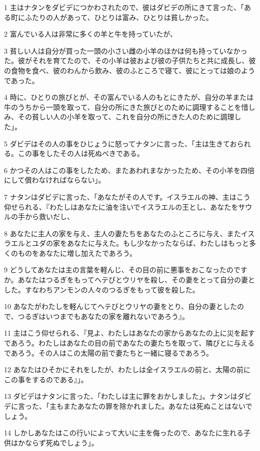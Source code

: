 \par 1 主はナタンをダビデにつかわされたので、彼はダビデの所にきて言った、「ある町にふたりの人があって、ひとりは富み、ひとりは貧しかった。
\par 2 富んでいる人は非常に多くの羊と牛を持っていたが、
\par 3 貧しい人は自分が買った一頭の小さい雌の小羊のほかは何も持っていなかった。彼がそれを育てたので、その小羊は彼および彼の子供たちと共に成長し、彼の食物を食べ、彼のわんから飲み、彼のふところで寝て、彼にとっては娘のようであった。
\par 4 時に、ひとりの旅びとが、その富んでいる人のもとにきたが、自分の羊または牛のうちから一頭を取って、自分の所にきた旅びとのために調理することを惜しみ、その貧しい人の小羊を取って、これを自分の所にきた人のために調理した」。
\par 5 ダビデはその人の事をひじょうに怒ってナタンに言った、「主は生きておられる。この事をしたその人は死ぬべきである。
\par 6 かつその人はこの事をしたため、またあわれまなかったため、その小羊を四倍にして償わなければならない」。
\par 7 ナタンはダビデに言った、「あなたがその人です。イスラエルの神、主はこう仰せられる、『わたしはあなたに油を注いでイスラエルの王とし、あなたをサウルの手から救いだし、
\par 8 あなたに主人の家を与え、主人の妻たちをあなたのふところに与え、またイスラエルとユダの家をあなたに与えた。もし少なかったならば、わたしはもっと多くのものをあなたに増し加えたであろう。
\par 9 どうしてあなたは主の言葉を軽んじ、その目の前に悪事をおこなったのですか。あなたはつるぎをもってヘテびとウリヤを殺し、その妻をとって自分の妻とした。すなわちアンモンの人々のつるぎをもって彼を殺した。
\par 10 あなたがわたしを軽んじてヘテびとウリヤの妻をとり、自分の妻としたので、つるぎはいつまでもあなたの家を離れないであろう』。
\par 11 主はこう仰せられる、『見よ、わたしはあなたの家からあなたの上に災を起すであろう。わたしはあなたの目の前であなたの妻たちを取って、隣びとに与えるであろう。その人はこの太陽の前で妻たちと一緒に寝るであろう。
\par 12 あなたはひそかにそれをしたが、わたしは全イスラエルの前と、太陽の前にこの事をするのである』」。
\par 13 ダビデはナタンに言った、「わたしは主に罪をおかしました」。ナタンはダビデに言った、「主もまたあなたの罪を除かれました。あなたは死ぬことはないでしょう。
\par 14 しかしあなたはこの行いによって大いに主を侮ったので、あなたに生れる子供はかならず死ぬでしょう」。
